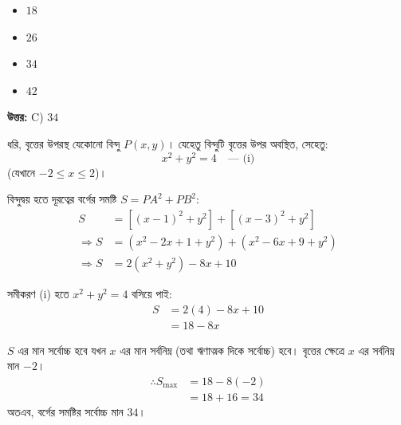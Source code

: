 \documentclass[12pt, a4paper]{article}
\begin{document}
\vspace{1em}
\begin{itemize}[label={}, leftmargin=1cm, itemsep=0.5em]
    \item[\textbf{A)}] $18$
    \item[\textbf{B)}] $26$
    \item[\textbf{C)}] $34$
    \item[\textbf{D)}] $42$
\end{itemize}

\vspace{0.5em}
\begin{tcolorbox}[answerbox]
    \textbf{\color{success} উত্তর:} C) $34$
\end{tcolorbox}
\vspace{1em}

\begin{tcolorbox}[solutionbox={সমাধান (Solution)}]
    \noindent
    ধরি, বৃত্তের উপরস্থ যেকোনো বিন্দু $P(x, y)$। 
    যেহেতু বিন্দুটি বৃত্তের উপর অবস্থিত, সেহেতু: 
    \[ x^2 + y^2 = 4 \quad \text{--- (i)} \]
    (যেখানে $-2 \le x \le 2$)।
    
    \vspace{0.5em}
    বিন্দুদ্বয় হতে দূরত্বের বর্গের সমষ্টি $S = PA^2 + PB^2$:
    \begin{align*}
        S &= \left[(x - 1)^2 + y^2\right] + \left[(x - 3)^2 + y^2\right] \\
        \Rightarrow S &= (x^2 - 2x + 1 + y^2) + (x^2 - 6x + 9 + y^2) \\
        \Rightarrow S &= 2(x^2 + y^2) - 8x + 10
    \end{align*}
    
    সমীকরণ (i) হতে $x^2 + y^2 = 4$ বসিয়ে পাই:
    \begin{align*}
        S &= 2(4) - 8x + 10 \\
          &= 18 - 8x
    \end{align*}
    
    $S$ এর মান সর্বোচ্চ হবে যখন $x$ এর মান সর্বনিম্ন (তথা ঋণাত্মক দিকে সর্বোচ্চ) হবে। 
    বৃত্তের ক্ষেত্রে $x$ এর সর্বনিম্ন মান $-2$। 
    \begin{align*}
        \therefore S_{\max} &= 18 - 8(-2) \\
                            &= 18 + 16 = 34
    \end{align*}
    অতএব, বর্গের সমষ্টির সর্বোচ্চ মান \textbf{$34$}।
\end{tcolorbox}

\vspace{2em}
\end{document}

